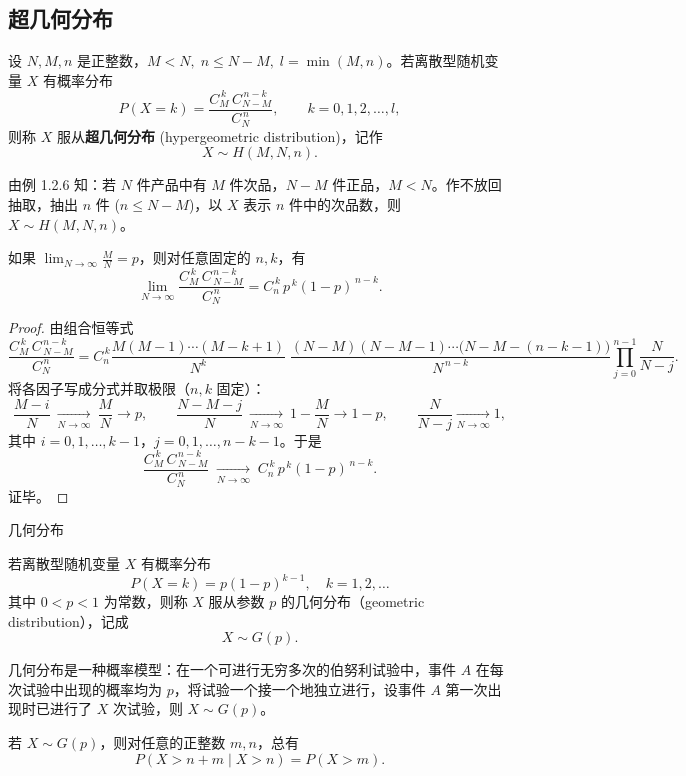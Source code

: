 \subsection{超几何分布}
\begin{definition}[超几何分布]
设 $N, M, n$ 是正整数，$M < N,\; n \leq N-M,\; l=\min(M,n)$。若离散型随机变量 $X$ 有概率分布
\[
P(X=k)=\frac{C_{M}^{\,k}\,C_{N-M}^{\,n-k}}{C_{N}^{\,n}}, 
\qquad k=0,1,2,\dots,l, \tag{2.1.4}
\]
则称 $X$ 服从\textbf{超几何分布} (hypergeometric distribution)，记作
\[
X \sim H(M,N,n).
\]

由例 1.2.6 知：若 $N$ 件产品中有 $M$ 件次品，$N-M$ 件正品，$M<N$。作不放回抽取，抽出 $n$ 件 ($n \leq N-M$)，以 $X$ 表示 $n$ 件中的次品数，则 $X \sim H(M,N,n)$。
\end{definition}
\begin{theorem}[2.1.2]
如果 $\displaystyle \lim_{N\to\infty}\frac{M}{N}=p$，则对任意固定的 $n,k$，有
\[
\lim_{N\to\infty}\frac{C_{M}^{\,k}\,C_{\,N-M}^{\,n-k}}{C_{N}^{\,n}}
= C_{n}^{\,k}\,p^{\,k}(1-p)^{\,n-k}. \tag{2.1.5}
\]
\end{theorem}

\begin{proof}
由组合恒等式
\[
\frac{C_{M}^{\,k}\,C_{\,N-M}^{\,n-k}}{C_{N}^{\,n}}
= C_{n}^{\,k}
\frac{M(M-1)\cdots(M-k+1)}{N^{k}}\;
\frac{(N-M)(N-M-1)\cdots\bigl(N-M-(n-k-1)\bigr)}{N^{\,n-k}}
\prod_{j=0}^{n-1}\frac{N}{N-j}.
\]
将各因子写成分式并取极限（$n,k$ 固定）：
\[
\frac{M-i}{N}\ \xrightarrow[N\to\infty]{}\ \frac{M}{N}\xrightarrow{}p,
\qquad
\frac{N-M-j}{N}\ \xrightarrow[N\to\infty]{}\ 1-\frac{M}{N}\xrightarrow{}1-p,
\qquad
\frac{N}{N-j}\xrightarrow[N\to\infty]{}1,
\]
其中 $i=0,1,\dots,k-1$，$j=0,1,\dots,n-k-1$。于是
\[
\frac{C_{M}^{\,k}\,C_{\,N-M}^{\,n-k}}{C_{N}^{\,n}}
\;\xrightarrow[N\to\infty]{}\;
C_{n}^{\,k}\,p^{\,k}(1-p)^{\,n-k}.
\]
证毕。
\end{proof}
 几何分布

若离散型随机变量 $X$ 有概率分布
\[
P(X=k)=p(1-p)^{k-1}, \quad k=1,2,\dots \tag{2.1.6}
\]
其中 $0<p<1$ 为常数，则称 $X$ 服从参数 $p$ 的几何分布（geometric distribution），记成
\[
X \sim G(p).
\]

几何分布是一种概率模型：在一个可进行无穷多次的伯努利试验中，事件 $A$ 在每次试验中出现的概率均为 $p$，将试验一个接一个地独立进行，设事件 $A$ 第一次出现时已进行了 $X$ 次试验，则 $X \sim G(p)$。
\begin{proposition}[几何分布的无记忆性]
若 $X \sim G(p)$，则对任意的正整数 $m,n$，总有
\[
P(X > n+m \mid X > n) = P(X > m).
\]
\end{proposition}

